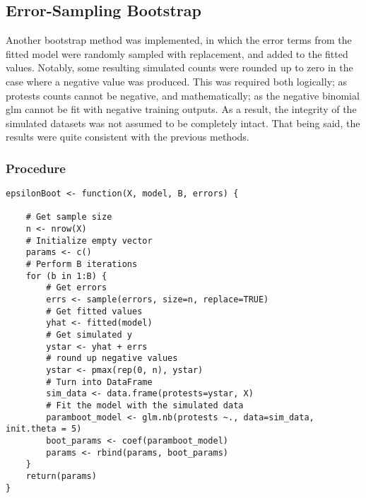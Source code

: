 \documentclass[12pt]{article}
\begin{document}
\subsection{Error-Sampling Bootstrap}
Another bootstrap method was implemented, in which the error terms from the fitted model were randomly sampled with replacement, and added to the fitted values. Notably, some resulting simulated counts were rounded up to zero in the case where a negative value was produced. This was required both logically; as protests counts cannot be negative, and mathematically; as the negative binomial glm cannot be fit with negative training outputs. As a result, the integrity of the simulated datasets was not assumed to be completely intact. That being said, the results were quite consistent with the previous methods.

\subsubsection*{Procedure}

\begin{lstlisting}
epsilonBoot <- function(X, model, B, errors) {

    # Get sample size
    n <- nrow(X)
    # Initialize empty vector
    params <- c()
    # Perform B iterations
    for (b in 1:B) {
        # Get errors
        errs <- sample(errors, size=n, replace=TRUE)
        # Get fitted values
        yhat <- fitted(model)
        # Get simulated y
        ystar <- yhat + errs
        # round up negative values
        ystar <- pmax(rep(0, n), ystar)
        # Turn into DataFrame
        sim_data <- data.frame(protests=ystar, X)
        # Fit the model with the simulated data
        paramboot_model <- glm.nb(protests ~., data=sim_data, init.theta = 5)
        boot_params <- coef(paramboot_model)
        params <- rbind(params, boot_params)
    }
    return(params)
}
\end{lstlisting}
\end{document}
